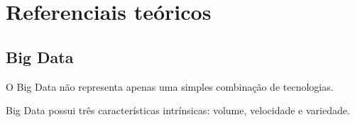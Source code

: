 \part{Referenciais teóricos}

\chapter{Big Data}

O Big Data não representa apenas uma simples combinação de tecnologias.

Big Data possui três características intrínsicas: volume, velocidade e variedade.





